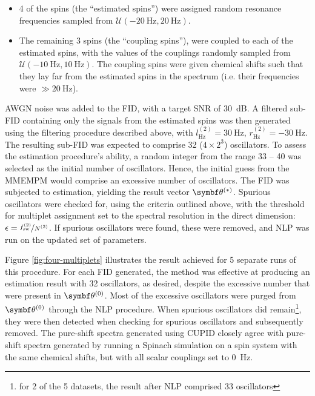 \begin{itemize}
    \item 4 of the spins (the ``estimated spins'') were assigned random
        resonance frequencies sampled from $\mathcal{U}(\qty{-20}{\hertz},
        \qty{20}{\hertz})$.
    \item The remaining 3 spins (the ``coupling spins''), were coupled to each
        of the estimated spins, with the values of the couplings randomly
        sampled from $\mathcal{U}(\qty{-10}{\hertz}, \qty{10}{\hertz})$.  The
        coupling spins were given chemical shifts such that they lay far from
        the estimated spins in the spectrum (i.e. their frequencies were $\gg
        \qty{20}{\hertz}$).
\end{itemize}
\ac{AWGN} noise was added to the \ac{FID}, with a target \ac{SNR} of \qty{30}{\deci\bel}.
A filtered sub-\ac{FID} containing only the signals from the estimated spins
was then generated using the filtering procedure described above, with
$l^{(2)}_{\unit{\hertz}} = \qty{30}{\hertz}$,
$r^{(2)}_{\unit{\hertz}} = \qty{-30}{\hertz}$.
The resulting sub-\ac{FID} was expected to comprise 32 ($4 \times
2^3$) oscillators. To assess the estimation procedure's ability, a random
integer from the range 33 -- 40 was selected as the initial number of
oscillators. Hence, the initial guess from the \ac{MMEMPM} would comprise an
excessive number of oscillators. The \ac{FID} was subjected to
estimation, yielding the result vector $\bthstar$. Spurious oscillators were
checked for, using the criteria outlined above, with the threshold for
multiplet assignment set to the spectral resolution in the direct
dimension:
$\epsilon = \nicefrac{f_{\text{sw}}^{(2)}}{N^{(2)}}$.  If spurious oscillators
were found, these were removed, and \ac{NLP} was run on the updated set of
parameters.

Figure \ref{fig:four-multiplets} illustrates the result achieved for 5 separate
runs of this procedure.
For each \ac{FID} generated, the method was effective at producing an
estimation result with 32 oscillators, as desired, despite the excessive number
that were present in $\bthzero$. Most of the excessive oscillators were purged
from $\bthzero$ through the \ac{NLP} procedure. When spurious oscillators did
remain\footnote{for 2 of the 5 datasets, the result after \ac{NLP} comprised 33
oscillators}, they were then detected when checking for spurious oscillators
and subsequently removed. The pure-shift spectra generated using \ac{CUPID}
closely agree with pure-shift spectra generated by running a Spinach simulation
on a spin system with the same chemical shifts, but with all scalar couplings
set to \qty{0}{\hertz}.

